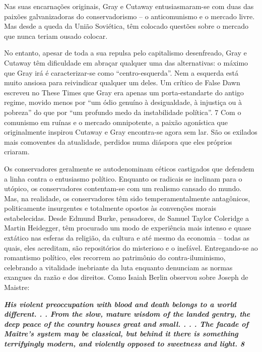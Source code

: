  
\par
 
Nas suas encarnações originais, Gray e Cutaway entusiasmaram-se com duas das paixões galvanizadoras do conservadorismo – o anticomunismo e o mercado livre. Mas desde a queda da União Soviética, têm colocado questões sobre o mercado que nunca teriam ousado colocar.
 
\par
 
No entanto, apesar de toda a sua repulsa pelo capitalismo desenfreado, Gray e Cutaway têm dificuldade em abraçar qualquer uma das alternativas: o máximo que Gray irá é caracterizar-se como “centro-esquerda”. Nem a esquerda está muito ansiosa para reivindicar qualquer um deles. Um crítico de False Dawn escreveu no These Times que Gray era apenas um porta-estandarte do antigo regime, movido menos por “um ódio genuíno à desigualdade, à injustiça ou à pobreza” do que por “um profundo medo da instabilidade política”.
 {\color{blue} 7}  
Com o comunismo em ruínas e o mercado omnipotente, a paixão agonística que originalmente inspirou Cutaway e Gray encontra-se agora sem lar. São os exilados mais comoventes da atualidade, perdidos numa diáspora que eles próprios criaram.
 
\par
 
Os conservadores geralmente se autodenominam céticos castigados que defendem a linha contra o entusiasmo político. Enquanto os radicais se inclinam para o utópico, os conservadores contentam-se com um realismo cansado do mundo. Mas, na realidade, os conservadores têm sido temperamentalmente antagônicos, politicamente insurgentes e totalmente opostos às convenções morais estabelecidas. Desde Edmund Burke, pensadores, de Samuel Taylor Coleridge a Martin Heidegger, têm procurado um modo de experiência mais intenso e quase extático nas esferas da religião, da cultura e até mesmo da economia – todas as quais, eles acreditam, são repositórios do misterioso e o inefável. Entregando-se ao romantismo político, eles recorrem ao patrimônio do contra-iluminismo, celebrando a vitalidade inebriante da luta enquanto denunciam as normas exangues da razão e dos direitos. Como Isaiah Berlin observou sobre Joseph de Maistre:
 
\par
 

 \textbf{\textit{His violent preoccupation with blood and death belongs to a world different. . . From the slow, mature wisdom of the landed gentry, the deep peace of the country houses great and small. . . . The facade of Maître’s system may be classical, but behind it there is something terrifyingly modern, and violently opposed to sweetness and light. {{\color{blue} 8} } } }  
 
